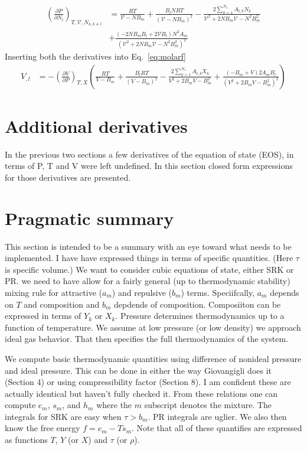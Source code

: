 \documentclass[11pt]{article}
\begin{document}
     \begin{align}
     \left(\frac{\partial P}{\partial N_{l}} \right)_{T,\mathcal{V},N_{k,k\neq l}} &= \frac{R T}{\mathcal{V}- N B_{m}} + \frac{B_l N R T}{\left(\mathcal{V}-N B_m\right)^2} - \frac{2 \sum_{k=1}^{N_{s}} A_{l,k} N_{k}}{\mathcal{V}^2+ 2 N B_{m} \mathcal{V} - N^2 B_m^2}  \nonumber \\
 &+ \frac{\left(-2N B_m B_l + 2\mathcal{V} B_l\right)N^2 A_m}{\left(\mathcal{V}^2+ 2 N B_{m} \mathcal{V} - N^2 B_m^2 \right)^2}
     \end{align}
    Inserting both the derivatives into Eq.~\ref{eq:molarf}
    \begin{align}
    V_{,l} &= -\left(\frac{\partial V}{\partial P}\right)_{T,X} \left(\frac{R T}{V- B_{m}} + \frac{B_l R T}{\left(V-B_m\right)^2} - \frac{2 \sum_{k=1}^{N_{s}} A_{l,k} X_{k}}{V^2+ 2 B_{m} V - B_m^2} + \frac{\left(-B_m + V\right) 2 A_m B_l}{\left(V^2+ 2 B_{m} V - B_m^2 \right)^2} \right)
    \end{align}
     \section{Additional derivatives}
     In the previous two sections a few derivatives of the equation of state (EOS), in terms of P, T and V were left undefined. In this section closed form expressions for those derivatives are presented. 
     
\section{Pragmatic summary}
\label{sec:john_summ}

This section is intended to be a summary with an eye toward what needs to be implemented.  I have
have expressed things in terms of specific quantities. (Here $\tau$ is specific volume.)
We want to consider cubic equations of state, either SRK or PR.  we need to have allow for a
fairly general (up to thermodynamic stability) mixing rule for attractive ($a_m$) and repulsive ($b_m$)
terms.  Speciifcally, $a_m$ depends on $T$ and composition and $b_m$ depdends of composition.  Composiiton
can be expressed in terms of $Y_k$ or $X_k$.   Pressure determines thermodynamics
up to a function of temperature.  
We assume at low pressure (or low density) we approach ideal gas behavior.  That then specifies
the full thermodynamics of the system.

We compute basic thermodynamic quantities using difference of nonideal pressure and ideal pressure.
This can be done in either the way Giovangigli does it (Section 4) or using compressibility factor (Section 8).
I am confident these are actually identical but haven't fully checked it.
From these relations one can compute $e_m$, $s_m$, and $h_m$ where the $m$ subscript denotes the mixture.
The integrals for SRK are easy when $\tau > b_m$.  PR integrals are uglier.
We also then know the free energy $f = e_m - T s_m$.
Note that all of these quantifies are expressed as functions $T$, $Y$ (or $X$) and $\tau$ (or $\rho$).
\end{document}
